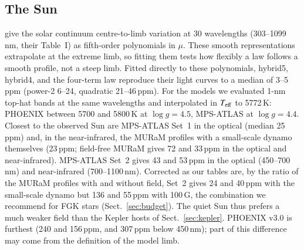 \documentclass{aa}
\newcommand{\ppm}{\,\textrm{ppm}}
\newcommand{\teff}{T_{\rm eff}}
\begin{document}
\subsection{The Sun}
\citet{neckel1994} give the solar continuum centre-to-limb variation at 30
wavelengths (303--1099\,nm, their Table~I) as fifth-order polynomials in $\mu$.
These smooth representations extrapolate at the extreme limb, so fitting them
tests how flexibly a law follows a smooth profile, not a steep limb. Fitted directly to these polynomials, hybrid5, hybrid4, and
the four-term law reproduce their light curves to a median of 3--5\ppm{}
(power-2 6--24, quadratic 21--46\ppm). For the models we evaluated 1-nm top-hat
bands at the same wavelengths and interpolated in $\teff$ to 5772\,K: PHOENIX
between 5700 and 5800\,K at $\log g=4.5$, MPS-ATLAS at $\log g=4.4$.
Closest to the observed Sun are MPS-ATLAS Set~1 in the optical (median
25\ppm) and, in the near-infrared, the MURaM profiles with a small-scale dynamo
themselves (23\ppm; field-free MURaM gives 72 and 33\ppm{} in the optical and
near-infrared). MPS-ATLAS Set~2 gives
43 and 53\ppm{} in the optical (450--700\,nm) and near-infrared
(700--1100\,nm). Corrected as our tables are, by the ratio of the MURaM
profiles with and without field, Set~2 gives 24 and 40\ppm{} with the
small-scale dynamo but 136 and 55\ppm{} with 100\,G, the combination we
recommend for FGK stars (Sect.~\ref{sec:budget}). The quiet Sun thus prefers
a much weaker field than the Kepler hosts of Sect.~\ref{sec:kepler}.
PHOENIX v3.0 is furthest (240 and 156\ppm, and 307\ppm{} below 450\,nm); part
of this difference may come from the definition of the model limb.
\end{document}
